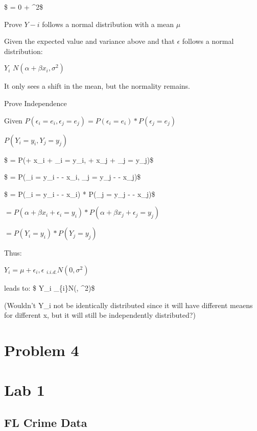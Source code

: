 \documentclass[
]{article}
\begin{document}
\$ = 0 + \sigma\^{}2\$

Prove \(Y-i\) follows a normal distribution with a mean \(\mu\)

Given the expected value and variance above and that \(\epsilon\)
follows a normal distribution:

\(Y_i \text{~} N(\alpha + \beta x_i, \sigma^2)\)

It only sees a shift in the mean, but the normality remains.

Prove Independence

Given
\(P(\epsilon_i = e_i, \epsilon_j = e_j) = P(\epsilon_i = e_i)*P(\epsilon_j = e_j)\)

\(P(Y_i = y_i, Y_j=y_j)\)

\$ = P(\alpha + \beta x\_i + \epsilon\_i = y\_i, \alpha + \beta x\_j +
\epsilon\_j = y\_j)\$

\$ = P(\epsilon\_i = y\_i - \alpha - \beta x\_i, \epsilon\_j = y\_j -
\alpha - \beta x\_j)\$

\$ = P(\epsilon\_i = y\_i - \alpha - \beta x\_i) * P(\epsilon\_j = y\_j
- \alpha - \beta x\_j)\$

\(= P(\alpha + \beta x_i + \epsilon_i = y_i) * P(\alpha + \beta x_j + \epsilon_j = y_j)\)

\(= P(Y_i = y_i) * P(Y_j = y_j)\)

Thus:

\(Y_i = \mu + \epsilon_i, \epsilon \text{~} _{i.i.d.} N(0,\sigma^2)\)

leads to: \$ Y\_i \text{~} \_\{i\}N(\mu, \sigma\^{}2)\$

(Wouldn't Y\_i not be identically distributed since it will have
different meaens for different x, but it will still be independently
distributed?)

\hypertarget{problem-4}{%
\section{Problem 4}\label{problem-4}}

\hypertarget{lab-1}{%
\section{Lab 1}\label{lab-1}}

\hypertarget{fl-crime-data}{%
\subsection{FL Crime Data}\label{fl-crime-data}}
\end{document}
